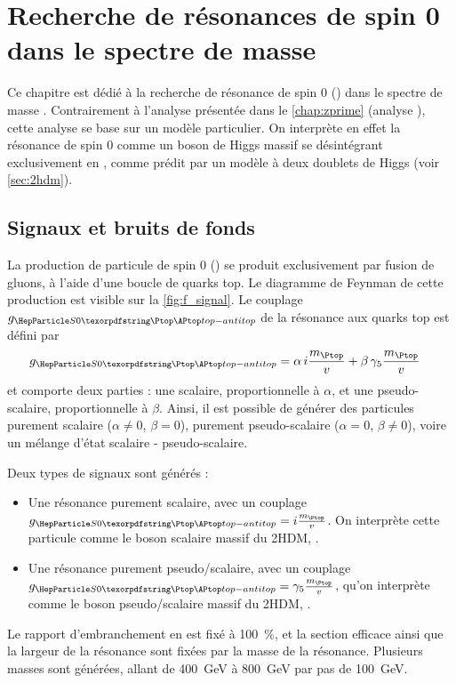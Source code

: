 \chapter{Recherche de résonances de spin 0 dans le spectre de masse \ttbar} \label{chap:higgs}

Ce chapitre est dédié à la recherche de résonance de spin 0 (\sz) dans le spectre de masse \ttbar. Contrairement à l'analyse présentée dans le \cref{chap:zprime} (analyse \zprime), cette analyse se base sur un modèle particulier. On interprète en effet la résonance de spin 0 comme un boson de Higgs massif se désintégrant exclusivement en \ttbar, comme prédit par un modèle à deux doublets de Higgs (voir \cref{sec:2hdm}).

\section{Signaux et bruits de fonds}

La production de particule de spin 0 (\sz) se produit exclusivement par fusion de gluons, à l'aide d'une boucle de quarks top. Le diagramme de Feynman de cette production est visible sur la \cref{fig:f_signal}. Le couplage $g_{\sz \ttbar}$ de la résonance aux quarks top est défini par
\begin{align*}
  g_{\sz \ttbar} &= \alpha \, i \frac{m_{\Ptop}}{v} + \beta \, \gfive \frac{m_{\Ptop}}{v}
\end{align*}
et comporte deux parties : une scalaire, proportionnelle à $\alpha$, et une pseudo-scalaire, proportionnelle à $\beta$. Ainsi, il est possible de générer des particules purement scalaire ($\alpha \neq 0$, $\beta = 0$), purement pseudo-scalaire ($\alpha = 0$, $\beta \neq 0$), voire un mélange d'état scalaire - pseudo-scalaire.

\medskip

Deux types de signaux sont générés :
\begin{itemize}
    \item Une résonance purement scalaire, avec un couplage $g_{\sz \ttbar} = i \frac{m_{\Ptop}}{v}$. On interprète cette particule comme le boson scalaire massif du 2HDM, \PHz.
    \item Une résonance purement pseudo\-/scalaire, avec un couplage $g_{\sz \ttbar} = \gfive \frac{m_{\Ptop}}{v}$, qu'on interprète comme le boson pseudo\-/scalaire massif du 2HDM, \PAz.
\end{itemize}

Le rapport d'embranchement en \ttbar est fixé à \SI{100}{\percent}, et la section efficace ainsi que la largeur de la résonance sont fixées par la masse de la résonance. Plusieurs masses sont générées, allant de \SI{400}{\GeV} à \SI{800}{\GeV} par pas de \SI{100}{\GeV}.

